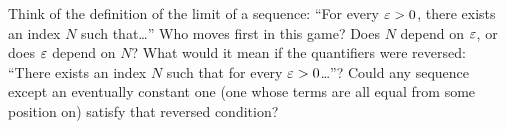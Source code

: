 \begin{walkbox}
Think of the definition of the limit of a sequence: ``For every $\varepsilon > 0$, there exists an index $N$ such that\ldots'' Who moves first in this game? Does $N$ depend on $\varepsilon$, or does $\varepsilon$ depend on $N$? What would it mean if the quantifiers were reversed: ``There exists an index $N$ such that for every $\varepsilon > 0$\ldots''? Could any sequence except an eventually constant one (one whose terms are all equal from some position on) satisfy that reversed condition?
\end{walkbox}

\newpage
